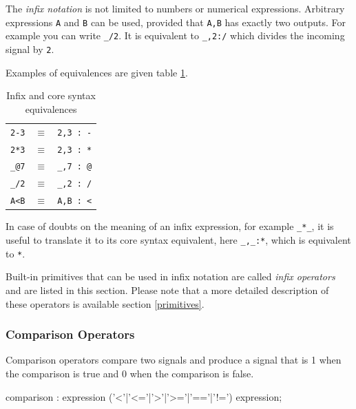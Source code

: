 The \emph{infix notation} is not limited to numbers or numerical expressions. Arbitrary expressions \lstinline'A' and \lstinline'B' can be used, provided that \lstinline'A,B' has exactly two outputs. For example you can write \lstinline'_/2'. It is equivalent to \lstinline'_,2:/' which divides the incoming signal by \lstinline'2'. 

Examples of equivalences are given table \ref{tab-infixrules}.

\begin{table}[h]
	\begin{center}
	\begin{tabular}{|rcl|}
	\hline
	\lstinline'2-3' & $\equiv$ & \lstinline'2,3 : -'\\
	\lstinline'2*3' & $\equiv$ & \lstinline'2,3 : *'\\
	\lstinline'_@7' & $\equiv$ & \lstinline'_,7 : @'\\
	\lstinline'_/2' & $\equiv$ & \lstinline'_,2 : /'\\
	\lstinline'A<B' & $\equiv$ & \lstinline'A,B : <'\\
	\hline
	\end{tabular}
	\end{center}
	\caption{Infix and core syntax equivalences}
	\label{tab-infixrules}
\end{table}

In case of doubts on the meaning of an infix expression, for example \lstinline'_*_', it is useful to translate it to its core syntax equivalent, here \lstinline'_,_:*', which is equivalent to \lstinline'*'.
	
Built-in primitives that can be used in infix notation are called \emph{infix operators} and are listed in this section. Please note that a more detailed description of these operators is available section \ref{primitives}. 


\subsubsection{Comparison Operators}

Comparison operators compare two signals and produce a signal that is 1 when the comparison is true and 0 when the comparison is false. 

\begin{rail}
	comparison : expression ('<'|'<='|'>'|'>='|'=='|'!=') expression;
\end{rail}

